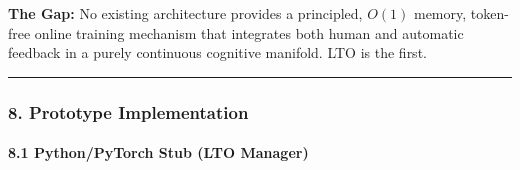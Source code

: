 \documentclass[
  11pt,
  a4paper,
]{article}
\begin{document}
\textbf{The Gap:} No existing architecture provides a principled,
\(O(1)\) memory, token-free online training mechanism that integrates
both human and automatic feedback in a purely continuous cognitive
manifold. LTO is the first.

\begin{center}\rule{0.5\linewidth}{0.5pt}\end{center}

\subsubsection{8. Prototype
Implementation}\label{prototype-implementation}

\paragraph{8.1 Python/PyTorch Stub (LTO
Manager)}\label{pythonpytorch-stub-lto-manager}
\end{document}
